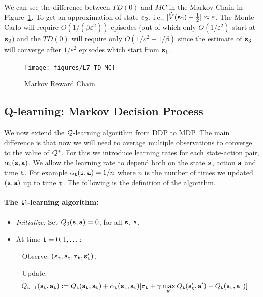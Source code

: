 We can see the difference between $TD(0)$ and $MC$ in the Markov
Chain in Figure~\ref{fig:L7-TD-MC}. To get an approximation of state
${\tt s}_2$, i.e., $|\widehat{V}({\tt s}_2)-\frac{1}{2}|\approx
\varepsilon$. The Monte-Carlo will require $O(1/(\beta
\varepsilon^2))$ episodes (out of which only $O(1/\varepsilon^2)$
start at ${\tt s}_2$) and the $TD(0)$ will require only
$O(1/\varepsilon^2+1/\beta)$ since the estimate of ${\tt s}_3$ will
converge after $1/\varepsilon^2$ episodes which start from
${\tt s}_1$.

\begin{figure}
  \begin{centering}
  \texttt{[image: figures/L7-TD-MC]}\\
  \caption{Markov Reward Chain}\label{fig:L7-TD-MC}
  \end{centering}
\end{figure}

\subsection{Q-learning: Markov Decision Process}


We now extend the $\mathcal{Q}$-learning algorithm from DDP to MDP. The main
difference is that now we will need to average multiple observations
to converge to the value of $\mathcal{Q}^*$. For this we introduce
learning rates for each state-action pair, $\alpha_{\tt t}({\tt s},{\tt a})$. We allow the
learning rate to depend both on the state ${\tt s}$, action ${\tt a}$
and time ${\tt t}$. For example $\alpha_{\tt t}({\tt s},{\tt a})=1/n$
where $n$ is the number of times we updated $({\tt s},{\tt a})$ up to
time ${\tt t}$. The following is the definition of the algorithm.

\paragraph{The $\mathcal{Q}$-learning algorithm:}

\begin{itemize}
\item {\em Initialize:} Set $ Q_0({\tt s},{\tt a})=0$, for all ${\tt s}$, ${\tt a}$.

\item At time ${\tt t}=0,1,\dots$:

-- Observe: $({\tt s}_{\tt t}, {\tt a}_{\tt t}, {\tt r}_{\tt t},
{\tt s}_{{\tt t}}')$.

-- Update: %
\begin{align*}
 Q_{{\tt t}+1}({\tt s}_{\tt t},{\tt a}_{\tt t}) & :=
 Q_{\tt t} ({\tt s}_{\tt t},{\tt a}_{\tt t}) + \alpha_{\tt t}({\tt s}_{\tt t},{\tt a}_{\tt t})  [{\tt r}_{\tt t} +
\gamma \max_{{\tt a}'} Q_{\tt t} ({\tt s}_{{\tt t}}', {\tt a}')
-Q_{\tt t} ({\tt s}_{\tt t},{\tt a}_{\tt t})]
\end{align*}
\end{itemize}


